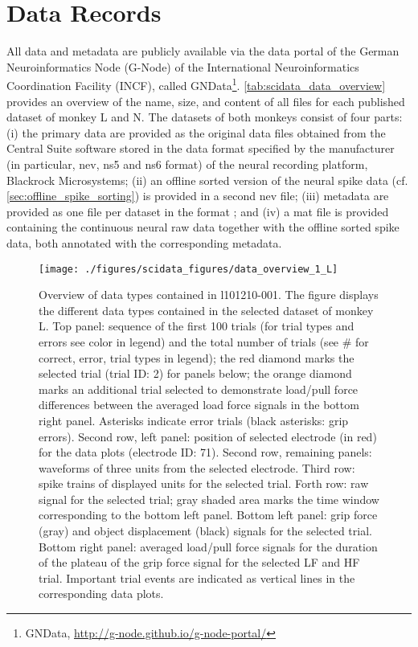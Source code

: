 \section{Data Records}

All data and metadata are publicly available via the data portal of the German Neuroinformatics Node (G-Node) of the International Neuroinformatics Coordination Facility (INCF), called GNData\footnote{GNData, \url{http://g-node.github.io/g-node-portal/}}. \cref{tab:scidata_data_overview} provides an overview of the name, size, and content of all files for each published dataset of monkey L and N. The datasets of both monkeys consist of four parts: (i) the primary data are provided as the original data files obtained from the Central Suite software stored in the data format specified by the manufacturer (in particular, nev, ns5 and ns6 format) of the neural recording platform, Blackrock Microsystems; (ii) an offline sorted version of the neural spike data (cf. \cref{sec:offline_spike_sorting}) is provided in a second nev file; (iii) metadata are provided as one file per dataset in the  format \citep{Grewe_2011, Zehl_2016}; and (iv) a mat file is provided containing the continuous neural raw data together with the offline sorted spike data, both annotated with the corresponding metadata.

\begin{figure}
 \centering
 \texttt{[image: ./figures/scidata\_figures/data\_overview\_1\_L]}
 \caption[Overview of data types contained in l101210-001]{Overview of data types contained in l101210-001. The figure displays the different data types contained in the selected dataset of monkey L. Top panel: sequence of the first 100 trials (for trial types and errors see color in legend) and the total number of trials (see \# for correct, error, trial types in legend); the red diamond marks the selected trial (trial ID: 2) for panels below; the orange diamond marks an additional trial selected to demonstrate load/pull force differences between the averaged load force signals in the bottom right panel. Asterisks indicate error trials (black asterisks: grip errors). Second row, left panel: position of selected electrode (in red) for the data plots (electrode ID: 71). Second row, remaining panels: waveforms of three units from the selected electrode. Third row: spike trains of displayed units for the selected trial. Forth row: raw signal for the selected trial; gray shaded area marks the time window corresponding to the bottom left panel. Bottom left panel: grip force (gray) and object displacement (black) signals for the selected trial. Bottom right panel: averaged load/pull force signals for the duration of the plateau of the grip force signal for the selected LF and HF trial. Important trial events are indicated as vertical lines in the corresponding data plots.}
 \label{fig:overview_data_l_1}
\end{figure}

